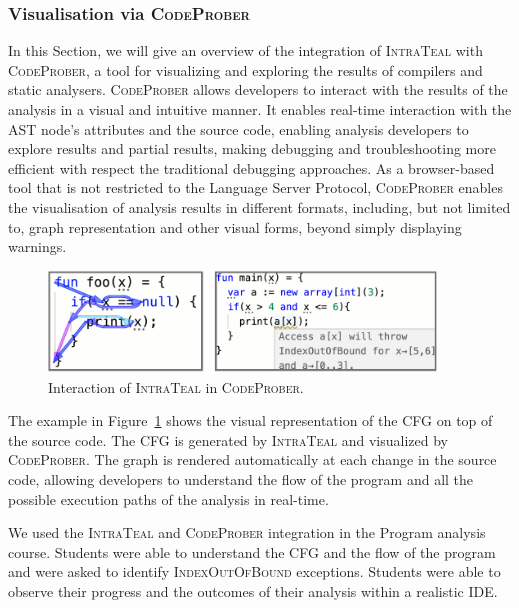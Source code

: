 \subsubsection{Visualisation via \textsc{CodeProber}}
In this Section, we will give an overview of the integration of \textsc{IntraTeal}
with \textsc{CodeProber}, a tool for visualizing and
exploring the results of compilers and static analysers. \textsc{CodeProber}
allows developers to interact with the results of the analysis in a visual and intuitive
manner. It enables real-time interaction with the AST node's attributes and the source code,
enabling analysis developers to explore results and partial results, making
debugging and troubleshooting more efficient with respect the traditional debugging
approaches. As a browser-based tool that is not restricted to the Language Server Protocol,
\textsc{CodeProber} enables the visualisation of analysis results in different
formats, including, but not limited to, graph representation and other visual forms, beyond
simply displaying warnings.
\begin{figure}[H]
  \centering
  \includegraphics[width=0.92\textwidth]{kappa/img/CP.pdf}
  \caption{\label{fig:CodeProber} Interaction of \textsc{IntraTeal} in \textsc{CodeProber}.}
\end{figure}
The example in Figure~\ref{fig:CodeProber} shows the visual representation of the CFG on
top of the source code. The CFG is generated by \textsc{IntraTeal} and visualized by
\textsc{CodeProber}. The graph is rendered automatically at each change in the source code,
allowing developers to understand the flow of the program and all the possible execution paths of the
analysis in real-time.

We used the \textsc{IntraTeal} and \textsc{CodeProber} integration in the Program analysis
course. Students were able to understand the CFG and the flow of the program and
were asked to identify \textsc{IndexOutOfBound} exceptions. Students were able to
observe their progress and the outcomes of their analysis within a realistic IDE.



